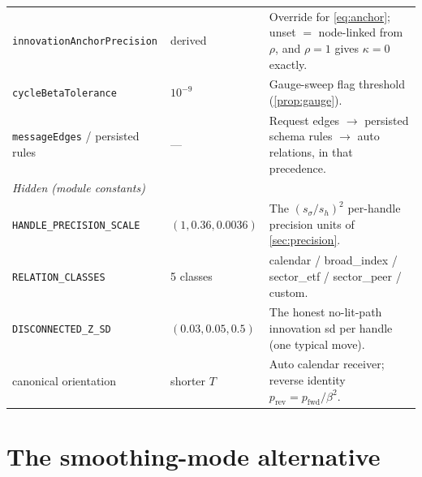 \documentclass[11pt]{article}
\begin{document}
\begin{longtable}{p{}p{}p{}}
\texttt{innovationAnchorPrecision} & derived & Override for
\eqref{eq:anchor}; unset $=$ node-linked from $\rho$, and $\rho=1$
gives $\kappa=0$ exactly.\\
\texttt{cycleBetaTolerance} & $10^{-9}$ & Gauge-sweep flag threshold
(\cref{prop:gauge}).\\
\texttt{messageEdges} / persisted rules & --- & Request edges $\to$
persisted schema rules $\to$ auto relations, in that precedence.\\
\midrule
\multicolumn{3}{l}{\emph{Hidden (module constants)}}\\ \midrule
\texttt{HANDLE\_PRECISION\_SCALE} & $(1,0.36,0.0036)$ & The
$(s_\sigma/s_h)^2$ per-handle precision units of
\cref{sec:precision}.\\
\texttt{RELATION\_CLASSES} & 5 classes & calendar / broad\_index /
sector\_etf / sector\_peer / custom.\\
\texttt{DISCONNECTED\_Z\_SD} & $(0.03,0.05,0.5)$ & The honest
no-lit-path innovation sd per handle (one typical move).\\
canonical orientation & shorter $T$ & Auto calendar receiver; reverse
identity $p_{\mathrm{rev}}=p_{\mathrm{fwd}}/\beta^2$.\\
\bottomrule
\end{longtable}
\endgroup

\section{The smoothing-mode alternative}
\label{app:smooth}
\end{document}
